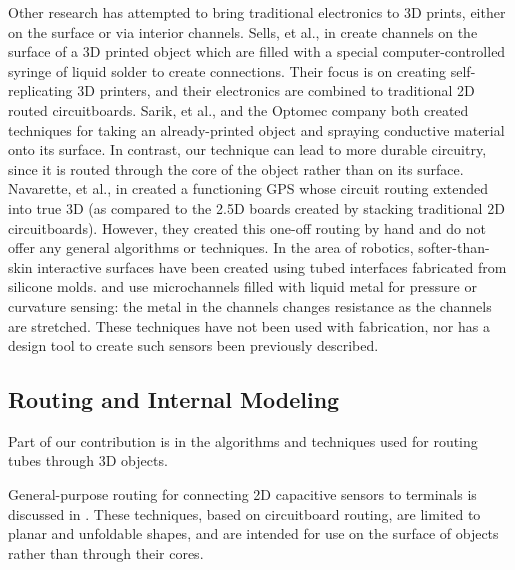 Other research has attempted to bring traditional electronics to 3D prints, either on the surface or via interior channels.  Sells, et al., in \cite{Sells-reprap} create channels on the surface of a 3D printed object which are filled with a special computer-controlled syringe of liquid solder to create connections.  Their focus is on creating self-replicating 3D printers, and their electronics are combined to traditional 2D routed circuitboards.  Sarik, et al., \cite{Sarik-tracebrush}  and the Optomec company \cite{optomec} both created techniques for taking an already-printed object and spraying conductive material onto its surface.  In contrast, our technique can lead to more durable circuitry, since it is routed through the core of the object rather than on its surface.  Navarette, et al., in \cite{Navarrette-gps} created a functioning GPS whose circuit routing extended into true 3D (as compared to the 2.5D boards created by stacking traditional 2D circuitboards).  However, they created this one-off routing by hand and do not offer any general algorithms or techniques.  In the area of robotics, softer-than-skin interactive surfaces have been created using tubed interfaces fabricated from silicone molds.  \cite{Park-microchannels} and \cite{Majidi-curvature} use microchannels filled with liquid metal for pressure or curvature sensing: the metal in the channels changes resistance as the channels are stretched.  These techniques have not been used with fabrication, nor has a design tool to create such sensors been previously described.

\subsection{Routing and Internal Modeling}

Part of our contribution is in the algorithms and techniques used for routing tubes through 3D objects.

General-purpose routing for connecting 2D capacitive sensors to terminals is discussed in \cite{Savage-midas}.  These techniques, based on circuitboard routing, are limited to planar and unfoldable shapes, and are intended for use on the surface of objects rather than through their cores.

